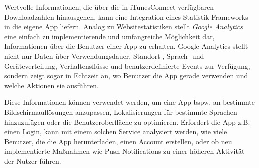 \documentclass[parskip=half, final]{scrreprt}
\begin{document}
Wertvolle Informationen, die über die in iTunesConnect verfügbaren Downloadzahlen hinausgehen, kann eine Integration eines Statistik-Frameworks in die eigene App liefern. Analog zu Websitestatistiken stellt \emph{Google Analytics } eine einfach zu implementierende und umfangreiche Möglichkeit dar, Informationen über die Benutzer einer App zu erhalten. Google Analytics stellt nicht nur Daten über Verwendungsdauer, Standort-, Sprach- und Geräteverteilung, Verhaltensflüsse und benutzerdefinierte Events zur Verfügung, sondern zeigt sogar in Echtzeit an, wo Benutzer die App gerade verwenden und welche Aktionen sie ausführen.

Diese Informationen können verwendet werden, um eine App bspw. an bestimmte Bildschirmauflösungen anzupassen, Lokalisierungen für bestimmte Sprachen hinzuzufügen oder die Benutzeroberfläche zu optimieren. Erfordert die App z.B. einen Login, kann mit einem solchen Service analysiert werden, wie viele Benutzer, die die App herunterladen, einen Account erstellen, oder ob neu implementierte Maßnahmen wie Push Notifications zu einer höheren Aktivität der Nutzer führen.
\end{document}
